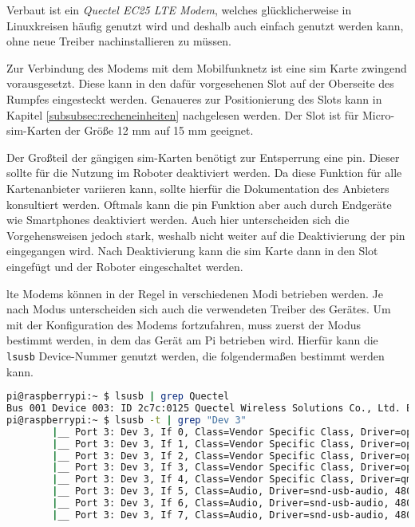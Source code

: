 Verbaut ist ein \emph{Quectel EC25 LTE Modem}, welches glücklicherweise in Linuxkreisen häufig genutzt wird und deshalb auch
einfach genutzt werden kann, ohne neue Treiber nachinstallieren zu müssen.


Zur Verbindung des Modems mit dem Mobilfunknetz ist eine \gls{sim} Karte zwingend vorausgesetzt.
Diese kann in den dafür vorgesehenen Slot auf der Oberseite des Rumpfes eingesteckt werden.
Genaueres zur Positionierung des Slots kann in Kapitel \ref{subsubsec:recheneinheiten} nachgelesen werden.
Der Slot ist für Micro-\gls{sim}-Karten der Größe \num{12} mm auf \num{15} mm geeignet.

Der Großteil der gängigen \gls{sim}-Karten benötigt zur Entsperrung eine \gls{pin}.
Dieser sollte für die Nutzung im Roboter deaktiviert werden.
Da diese Funktion für alle Kartenanbieter variieren kann, sollte hierfür die Dokumentation des Anbieters konsultiert werden.
Oftmals kann die \gls{pin} Funktion aber auch durch Endgeräte wie Smartphones deaktiviert werden.
Auch hier unterscheiden sich die Vorgehensweisen jedoch stark, weshalb nicht weiter auf die Deaktivierung der \gls{pin}
eingegangen wird.
Nach Deaktivierung kann die \gls{sim} Karte dann in den Slot eingefügt und der Roboter eingeschaltet werden.



\gls{lte} Modems können in der Regel in verschiedenen Modi betrieben werden.
Je nach Modus unterscheiden sich auch die verwendeten Treiber des Gerätes.
Um mit der Konfiguration des Modems fortzufahren, muss zuerst der Modus bestimmt werden, in dem das Gerät am Pi betrieben wird.
Hierfür kann die \texttt{lsusb} Device-Nummer genutzt werden, die folgendermaßen bestimmt werden kann.

\begin{lstlisting}[language=Bash]
pi@raspberrypi:~ $ lsusb | grep Quectel
Bus 001 Device 003: ID 2c7c:0125 Quectel Wireless Solutions Co., Ltd. EC25 LTE modem
pi@raspberrypi:~ $ lsusb -t | grep "Dev 3"
        |__ Port 3: Dev 3, If 0, Class=Vendor Specific Class, Driver=option, 480M
        |__ Port 3: Dev 3, If 1, Class=Vendor Specific Class, Driver=option, 480M
        |__ Port 3: Dev 3, If 2, Class=Vendor Specific Class, Driver=option, 480M
        |__ Port 3: Dev 3, If 3, Class=Vendor Specific Class, Driver=option, 480M
        |__ Port 3: Dev 3, If 4, Class=Vendor Specific Class, Driver=qmi_wwan, 480M
        |__ Port 3: Dev 3, If 5, Class=Audio, Driver=snd-usb-audio, 480M
        |__ Port 3: Dev 3, If 6, Class=Audio, Driver=snd-usb-audio, 480M
        |__ Port 3: Dev 3, If 7, Class=Audio, Driver=snd-usb-audio, 480M
\end{lstlisting}

